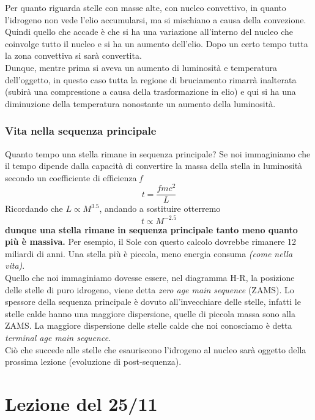 \documentclass[a4paper,11pt]{article}
\begin{document}
Per quanto riguarda stelle con masse alte, con nucleo convettivo, in quanto l'idrogeno non vede l'elio accumularsi, ma si mischiano a causa della convezione. Quindi quello che accade è che si ha una variazione all'interno del nucleo che coinvolge tutto il nucleo e si ha un aumento dell'elio. Dopo un certo tempo tutta la zona convettiva si sarà convertita.\\
Dunque, mentre prima si aveva un aumento di luminosità e temperatura dell'oggetto, in questo caso tutta la regione di bruciamento rimarrà inalterata (subirà una compressione a causa della trasformazione in elio) e qui si ha una diminuzione della temperatura nonostante un aumento della luminosità.
\subsubsection{Vita nella sequenza principale}
Quanto tempo una stella rimane in sequenza principale? Se noi immaginiamo che il tempo dipende dalla capacità di convertire la massa della stella in luminosità secondo un coefficiente di efficienza \textit{f}
$$t=\frac{fmc^2}{L}$$
Ricordando che $L\propto M^{3.5}$, andando a sostituire otterremo
$$t\propto M^{-2.5}$$
\textbf{dunque una stella rimane in sequenza principale tanto meno quanto più è massiva.} Per esempio, il Sole con questo calcolo dovrebbe rimanere 12 miliardi di anni. Una stella più è piccola, meno energia consuma \textit{(come nella vita)}.\\
Quello che noi immaginiamo dovesse essere, nel diagramma H-R, la posizione delle stelle di puro idrogeno, viene detta \textit{zero age main sequence} (ZAMS). Lo spessore della sequenza principale è dovuto all'invecchiare delle stelle, infatti le stelle calde hanno una maggiore dispersione, quelle di piccola massa sono alla ZAMS. La maggiore dispersione delle stelle calde che noi conosciamo è detta \textit{terminal age main sequence.}\\
Ciò che succede alle stelle che esauriscono l'idrogeno al nucleo sarà oggetto della prossima lezione (evoluzione di post-sequenza).

















\newpage 

\section{Lezione del 25/11}
\end{document}
